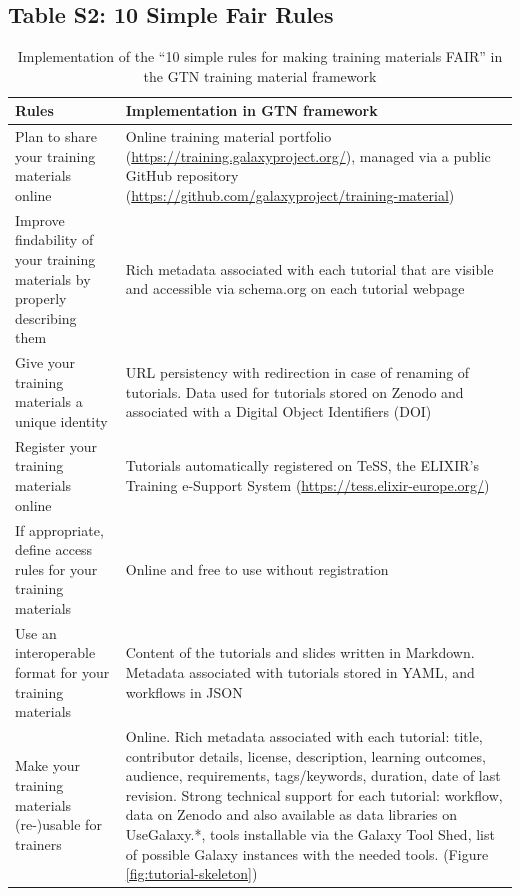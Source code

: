 \documentclass[10pt,letterpaper]{article}
\begin{document}
\subsection*{Table S2: 10 Simple Fair Rules}
\begin{table}[h!]
    \begin{adjustwidth}{-2in}{0in}
	\centering
    \caption{Implementation of the ``10 simple rules for making training materials FAIR'' \cite{Garcia2020} in the GTN training material framework
    \label{tbl:rulesforfair}}
	\begin{tabular}{p{}p{}}
		\textbf{Rules}                                                                & \textbf{Implementation in GTN framework}\\\hline
		Plan to share your training materials online                                  & Online training material portfolio (\url{https://training.galaxyproject.org/}), managed via a public GitHub repository (\url{https://github.com/galaxyproject/training-material})\\
		Improve findability of your training materials by properly describing them    & Rich metadata associated with each tutorial that are visible and accessible via schema.org on each tutorial webpage\\
		Give your training materials a unique identity                                & URL persistency with redirection in case of renaming of tutorials.
		Data used for tutorials stored on Zenodo and associated with a Digital Object Identifiers (DOI) \\
        Register your training materials online                                       & Tutorials automatically registered on TeSS, the ELIXIR's Training e-Support System (\url{https://tess.elixir-europe.org/})  \\
        If appropriate, define access rules for your training materials               &	Online and free to use without registration \\
        Use an interoperable format for your training materials                       &	Content of the tutorials and slides written in Markdown. Metadata associated with tutorials stored in YAML, and workflows in JSON\\
		Make your training materials (re-)usable for trainers                          & Online. Rich metadata associated with each tutorial: title, contributor details, license, description, learning outcomes, audience, requirements, tags/keywords, duration, date of last revision. Strong technical support for each tutorial: workflow, data on Zenodo and also available as data libraries on UseGalaxy.*, tools installable via the Galaxy Tool Shed, list of possible Galaxy instances with the needed tools. (Figure \ref{fig:tutorial-skeleton})\\

\end{tabular}
\end{adjustwidth}
\end{table}
\end{document}
